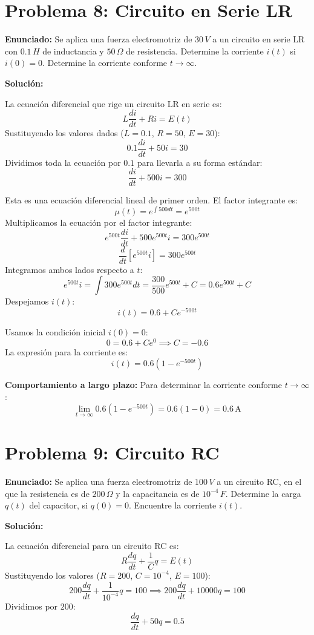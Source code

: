 \documentclass[a4paper]{article}
\begin{document}
\section{Problema 8: Circuito en Serie LR}

\textbf{Enunciado:} Se aplica una fuerza electromotriz de $30 \, V$ a un circuito en serie LR con $0.1 \, H$ de inductancia y $50 \, \Omega$ de resistencia. Determine la corriente $i(t)$ si $i(0) = 0$. Determine la corriente conforme $t \to \infty$.

\textbf{Solución:}

La ecuación diferencial que rige un circuito LR en serie es:
$$L \frac{di}{dt} + Ri = E(t)$$
Sustituyendo los valores dados ($L = 0.1$, $R = 50$, $E = 30$):
$$0.1 \frac{di}{dt} + 50i = 30$$
Dividimos toda la ecuación por $0.1$ para llevarla a su forma estándar:
$$\frac{di}{dt} + 500i = 300$$

Esta es una ecuación diferencial lineal de primer orden. El factor integrante es:
$$\mu(t) = e^{\int 500 dt} = e^{500t}$$
Multiplicamos la ecuación por el factor integrante:
$$e^{500t} \frac{di}{dt} + 500 e^{500t} i = 300 e^{500t}$$
$$\frac{d}{dt} [e^{500t} i] = 300 e^{500t}$$
Integramos ambos lados respecto a $t$:
$$e^{500t} i = \int 300 e^{500t} dt = \frac{300}{500} e^{500t} + C = 0.6 e^{500t} + C$$
Despejamos $i(t)$:
$$i(t) = 0.6 + C e^{-500t}$$

Usamos la condición inicial $i(0) = 0$:
$$0 = 0.6 + C e^{0} \implies C = -0.6$$
La expresión para la corriente es:
$$i(t) = 0.6 (1 - e^{-500t})$$

\textbf{Comportamiento a largo plazo:}
Para determinar la corriente conforme $t \to \infty$:
$$\lim_{t \to \infty} 0.6 (1 - e^{-500t}) = 0.6 (1 - 0) = 0.6 \, \text{A}$$

\section{Problema 9: Circuito RC}

\textbf{Enunciado:} Se aplica una fuerza electromotriz de $100 \, V$ a un circuito RC, en el que la resistencia es de $200 \, \Omega$ y la capacitancia es de $10^{-4} \, F$. Determine la carga $q(t)$ del capacitor, si $q(0) = 0$. Encuentre la corriente $i(t)$.

\textbf{Solución:}

La ecuación diferencial para un circuito RC es:
$$R \frac{dq}{dt} + \frac{1}{C} q = E(t)$$
Sustituyendo los valores ($R = 200$, $C = 10^{-4}$, $E = 100$):
$$200 \frac{dq}{dt} + \frac{1}{10^{-4}} q = 100 \implies 200 \frac{dq}{dt} + 10000q = 100$$
Dividimos por $200$:
$$\frac{dq}{dt} + 50q = 0.5$$
\end{document}
